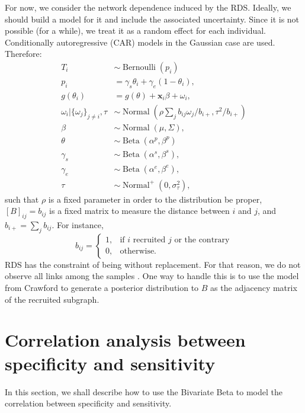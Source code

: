 \documentclass[a4paper, notitlepage, 11pt]{article}
\newcommand{\x}{\boldsymbol{x}}
\newcommand{\N}{\operatorname{Normal}}
\newcommand{\betadist}{\operatorname{Beta}}
\theoremstyle{definition}
\theoremstyle{remark}
\begin{document}
For now, we consider the network dependence induced by the RDS. Ideally, we 
should build a model for it and include the associated uncertainty.
Since it is not possible (for a while), we treat it as a random effect for
each individual. Conditionally autoregressive (CAR) models in the
Gaussian case are used. Therefore: 
\begin{equation}
  \begin{aligned}
    T_i &\sim \operatorname{Bernoulli}(p_i) \\
    p_i &= \gamma_s\theta_i + \gamma_e(1 - \theta_i),  \\
    g(\theta_i) &= g(\theta) + \x_i\beta + \omega_i,  \\
    \omega_i|\{\omega_j\}_{j\neq i}, \tau &\sim \N\left(\rho\sum_j b_{ij}\omega_j/b_{i+}, \tau^2/b_{i+}\right) \\
    \beta &\sim \N(\mu, \Sigma), \\ 
    \theta &\sim \betadist(\alpha^p, \beta^p) \\
    \gamma_s &\sim \betadist(\alpha^s, \beta^s), \\
    \gamma_e &\sim \betadist(\alpha^e, \beta^e), \\  
    \tau &\sim \N^+(0,\sigma^2_{\tau}),  
  \end{aligned}  
\end{equation}
such that $\rho$ is a fixed parameter in order to the distribution be proper, $[B]_{ij} = b_{ij}$ is a fixed matrix to measure the distance between $i$
and $j$, and $b_{i+} = \sum_{j} b_{ij}$. For instance, 
$$
b_{ij} = \begin{cases}
  1, &\text{if } i \text{ recruited } j \text{ or the contrary} \\
  0, &\text{otherwise.} 
\end{cases}
$$
RDS has the constraint of being without replacement. For that reason, we do
not observe all links among the samples \cite{crawford2016}. One way to handle
this is to use the model from Crawford to generate a posterior distribution to
$B$ as the adjacency matrix of the recruited subgraph. 


\section{Correlation analysis between specificity and sensitivity}

In this section, we shall describe how to use the Bivariate Beta
\cite{olkin2015constructions} to model the correlation between specificity and
sensitivity.

 
\end{document}
